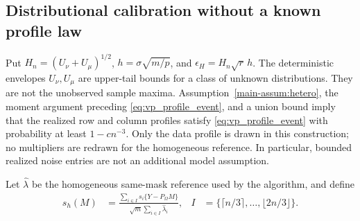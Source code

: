 \documentclass[numsec,webpdf,modern,large,namedate]{oup-authoring-template}
\theoremstyle{plain}
\theoremstyle{remark}
\newif\ifmarkchanges
\newenvironment{revision}{\begingroup\ifmarkchanges\color{red}\fi}{\endgroup}
\begin{document}
\begin{revision}
\subsection{Distributional calibration without a known profile law}
Put $H_n=(U_\nu+U_\mu)^{1/2}$, $h=\sigma\sqrt{m/p}$, and
$\epsilon_H=H_n\sqrt r\,h$. The deterministic envelopes $U_\nu,U_\mu$ are
upper-tail bounds for a class of unknown distributions. They are not the
unobserved sample maxima. Assumption~\ref{main-assum:hetero}, the moment
argument preceding \eqref{eq:vp_profile_event}, and a union bound imply
that the realized row and column profiles satisfy
\eqref{eq:vp_profile_event} with probability at least $1-cn^{-3}$.
Only the data profile is drawn in this construction; no multipliers are
redrawn for the homogeneous reference. In particular, bounded realized
noise entries are not an additional model assumption.

Let $\widehat\lambda$ be the homogeneous same-mask reference used by the
algorithm, and define
\begin{align}
 s_h(M)&=\frac{\sum_{i\in I}s_i\{Y-P_\Omega M\}}
                 {\sqrt m\sum_{i\in I}\widehat\lambda_i},&
 I&=\{\lceil n/3\rceil,\ldots,\lfloor2n/3\rfloor\}.
 \label{eq:wc_homogeneous_scale}
\end{align}


\end{revision}
\end{document}
